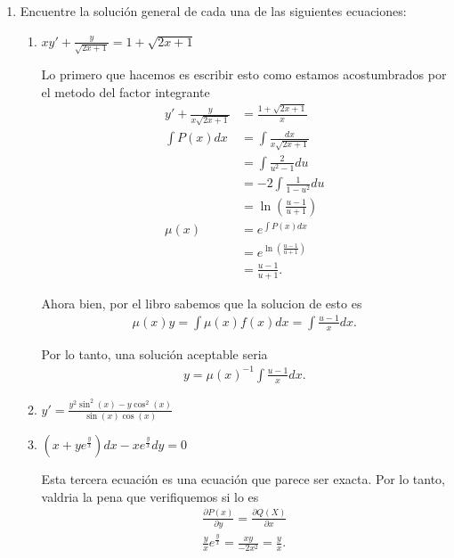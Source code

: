 


    

    \begin{enumerate}
      \item Encuentre la solución general de cada una de las siguientes ecuaciones:
	\begin{enumerate}
	  \item $xy' + \frac{y}{\sqrt{2x + 1} } = 1 + \sqrt{2x + 1} $ 

	    Lo primero que hacemos es escribir esto como estamos acostumbrados por el metodo del factor integrante
	    \begin{align*}
	      y' + \frac{y}{x\sqrt{2x+1} }&= \frac{1+\sqrt{2x+1} }{x} \\
	      \int P(x) dx &= \int \frac{dx}{x\sqrt{2x+1} } \\
	      &= \int \frac{2}{u^2-1}du \\
	      &= -2 \int \frac{1}{1-u^2}du \\
	      &= \ln\left( \frac{u-1}{u+1} \right)  \\
	      \mu\left( x \right) &= e^{\int P(x) dx} \\
	      &= e^{\ln\left( \frac{u-1}{u + 1} \right) } \\
	      &= \frac{u-1}{u+1}
	    .\end{align*}

	    Ahora bien, por el libro sabemos que la solucion de esto es
	    \begin{align*}
	      \mu\left( x \right) y = \int \mu\left( x \right) f\left( x \right) dx = \int \frac{u-1}{x}dx
	    .\end{align*}

	    Por lo tanto, una solución aceptable seria
	    \begin{align*}
	      y = \mu \left( x \right)^{-1}\int \frac{u-1}{x}dx
	    .\end{align*}
	  \item $y' = \frac{y^2\sin^2\left( x \right) - y\cos^2\left( x \right) }{\sin\left( x \right) \cos\left( x \right) }$

	  \item $\left( x + ye^{\frac{y}{x}} \right) dx - xe^{\frac{y}{x}}dy = 0$

	    Esta tercera ecuación es una ecuación que parece ser exacta. Por lo tanto, valdria la pena que verifiquemos si lo es
	    \begin{align*}
	      \frac{\partial P\left( x \right) }{\partial y} = \frac{\partial Q\left( X \right) }{\partial x}  \\
	      \frac{y}{x}e^{\frac{y}{x}} = \frac{xy}{-2x^2} = \frac{y}{x}
	    .\end{align*}


\end{enumerate}
\end{enumerate}
